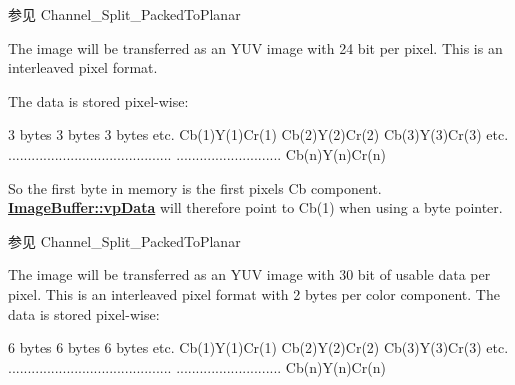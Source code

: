 \begin{Desc}
\begin{description}
\begin{DoxySeeAlso}{参见}
Channel\+\_\+\+Split\+\_\+\+Packed\+To\+Planar 
\end{DoxySeeAlso}
\item[{\em 
\hypertarget{group___common_interface_gga02e0fc32ff10e0bc0f2e8b9c321d65c9a2faa08d7046df3283d3d581e949c36a3}{idpf\+Y\+U\+V444\+\_\+\+U\+Y\+V\+Packed}\label{group___common_interface_gga02e0fc32ff10e0bc0f2e8b9c321d65c9a2faa08d7046df3283d3d581e949c36a3}
}]The image will be transferred as an Y\+U\+V image with 24 bit per pixel. This is an interleaved pixel format.

The data is stored pixel-\/wise\+:


\begin{DoxyCode}
3 bytes        3 bytes        3 bytes      etc.
Cb(1)Y(1)Cr(1) Cb(2)Y(2)Cr(2) Cb(3)Y(3)Cr(3) etc.
..........................................
...........................   Cb(n)Y(n)Cr(n)
\end{DoxyCode}


So the first byte in memory is the first pixels Cb component. {\bfseries \hyperlink{struct_image_buffer_ab67c9c21d749e786302c848b508e0673}{Image\+Buffer\+::vp\+Data}} will therefore point to Cb(1) when using a byte pointer.

\begin{DoxySeeAlso}{参见}
Channel\+\_\+\+Split\+\_\+\+Packed\+To\+Planar 
\end{DoxySeeAlso}
\item[{\em 
\hypertarget{group___common_interface_gga02e0fc32ff10e0bc0f2e8b9c321d65c9a02478a7fcb09f233627892996f164adc}{idpf\+Y\+U\+V444\+\_\+\+U\+Y\+V\+\_\+10\+Packed}\label{group___common_interface_gga02e0fc32ff10e0bc0f2e8b9c321d65c9a02478a7fcb09f233627892996f164adc}
}]The image will be transferred as an Y\+U\+V image with 30 bit of usable data per pixel. This is an interleaved pixel format with 2 bytes per color component. The data is stored pixel-\/wise\+:


\begin{DoxyCode}
6 bytes        6 bytes        6 bytes      etc.
Cb(1)Y(1)Cr(1) Cb(2)Y(2)Cr(2) Cb(3)Y(3)Cr(3) etc.
..........................................
...........................   Cb(n)Y(n)Cr(n)
\end{DoxyCode}



\end{description}
\end{Desc}

